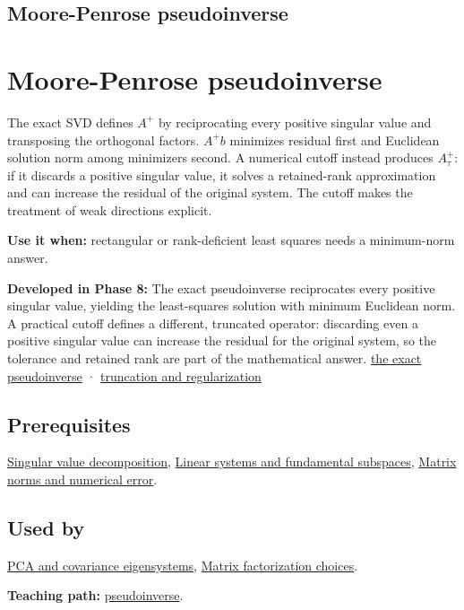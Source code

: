\hypertarget{appendix-541306fdbc1b}{}
\section*{Moore-Penrose pseudoinverse}
\chapter{Moore-Penrose pseudoinverse}\label{appendix-541306fdbc1b-moore-penrose-pseudoinverse}

The exact SVD defines \(A^+\) by reciprocating every positive singular value and transposing the orthogonal factors. \(A^+b\) minimizes residual first and Euclidean solution norm among minimizers second. A numerical cutoff instead produces \(A_\tau^+\): if it discards a positive singular value, it solves a retained-rank approximation and can increase the residual of the original system. The cutoff makes the treatment of weak directions explicit.

\textbf{Use it when:} rectangular or rank-deficient least squares needs a minimum-norm answer.

\textbf{Developed in Phase 8:} The exact pseudoinverse reciprocates every positive singular value, yielding the least-squares solution with minimum Euclidean norm. A practical cutoff defines a different, truncated operator: discarding even a positive singular value can increase the residual for the original system, so the tolerance and retained rank are part of the mathematical answer. \href{Continuous\%20Notes/Computing\%20Foundations\%20-\%20From\%20Bits\%20to\%20C++\%20and\%20Systems\%20APIs\#The\%20Moore–Penrose\%20inverse\%20and\%20its\%20four\%20identities}{the exact pseudoinverse} · \href{Continuous\%20Notes/Computing\%20Foundations\%20-\%20From\%20Bits\%20to\%20C++\%20and\%20Systems\%20APIs\#Thresholding\%20and\%20regularization\%20are\%20different\%20choices}{truncation and regularization}

\section{Prerequisites}\label{appendix-541306fdbc1b-prerequisites}

\hyperref[appendix-1fad5e7f36fa]{Singular value decomposition}, \hyperref[appendix-8572a4a060c1]{Linear systems and fundamental subspaces}, \hyperref[appendix-f8657bac66e5]{Matrix norms and numerical error}.

\section{Used by}\label{appendix-541306fdbc1b-used-by}

\hyperref[appendix-ad175ef3c5bf]{PCA and covariance eigensystems}, \hyperref[appendix-221a483bec2d]{Matrix factorization choices}.

\textbf{Teaching path:} \href{Continuous\%20Notes/Computing\%20Foundations\%20-\%20From\%20Bits\%20to\%20C++\%20and\%20Systems\%20APIs\#Pseudoinverse\%20makes\%20least\%20squares\%20and\%20minimum\%20norm\%20one\%20operation}{pseudoinverse}.
